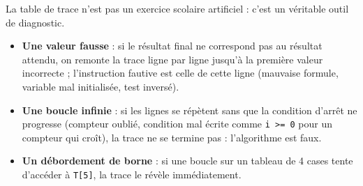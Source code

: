 \documentclass[11pt]{article}
\newcommand{\cle}[1]{{\popxbold\color{popdark}#1}}
\begin{document}
La table de trace n'est pas un exercice scolaire artificiel : c'est un véritable \cle{outil de diagnostic}.

\begin{aretenir}
\begin{itemize}
\item \textbf{Une valeur fausse} : si le résultat final ne correspond pas au résultat attendu, on remonte la trace ligne par ligne jusqu'à la première valeur incorrecte ; l'instruction fautive est celle de cette ligne (mauvaise formule, variable mal initialisée, test inversé).
\item \textbf{Une boucle infinie} : si les lignes se répètent sans que la condition d'arrêt ne progresse (compteur oublié, condition mal écrite comme \texttt{i >= 0} pour un compteur qui croît), la trace ne se termine pas : l'algorithme est faux.
\item \textbf{Un débordement de borne} : si une boucle sur un tableau de 4 cases tente d'accéder à \texttt{T[5]}, la trace le révèle immédiatement.
\end{itemize}
\end{aretenir}
\end{document}
